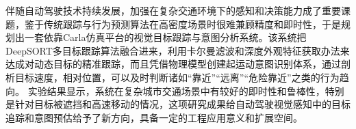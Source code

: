 \begin{abstractzh}

    伴随自动驾驶技术持续发展，加强在复杂交通环境下的感知和决策能力成了重要课题，鉴于传统跟踪与行为预测算法在高密度场景时很难兼顾精度和即时性，于是规划出一套依靠Carla仿真平台的视觉目标跟踪与意图分析系统。该系统把DeepSORT多目标跟踪算法融合进来，利用卡尔曼滤波和深度外观特征获取办法来达成对动态目标的精准跟踪，而且凭借物理模型创建起运动意图识别体系，通过剖析目标速度，相对位置，可以及时判断诸如“靠近”“远离”“危险靠近”之类的行为趋向。 实验结果显示，系统在复杂城市交通场景中有较好的即时性和鲁棒性，特别是针对目标被遮挡和高速移动的情况，这项研究成果给自动驾驶视觉感知中的目标追踪和意图预估给予了新方向，具备一定的工程应用意义和扩展空间。
    

\end{abstractzh}
